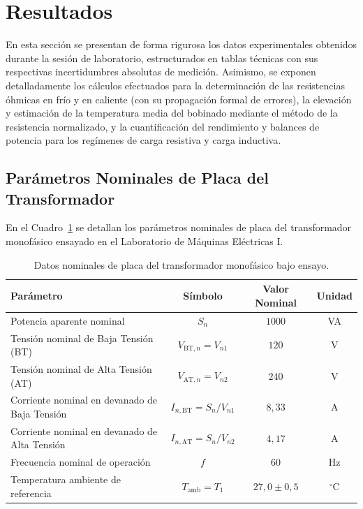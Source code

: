\section{Resultados}

En esta sección se presentan de forma rigurosa los datos experimentales obtenidos durante la sesión de laboratorio, estructurados en tablas técnicas con sus respectivas incertidumbres absolutas de medición. Asimismo, se exponen detalladamente los cálculos efectuados para la determinación de las resistencias óhmicas en frío y en caliente (con su propagación formal de errores), la elevación y estimación de la temperatura media del bobinado mediante el método de la resistencia normalizado, y la cuantificación del rendimiento y balances de potencia para los regímenes de carga resistiva y carga inductiva.

\subsection{Parámetros Nominales de Placa del Transformador}

En el Cuadro~\ref{tab:placa_tx} se detallan los parámetros nominales de placa del transformador monofásico ensayado en el Laboratorio de Máquinas Eléctricas I.

\begin{table}[htbp]
    \centering
    \caption{Datos nominales de placa del transformador monofásico bajo ensayo.}
    \label{tab:placa_tx}
    \begin{tabular}{l c c c}
        \toprule
        \textbf{Parámetro} & \textbf{Símbolo} & \textbf{Valor Nominal} & \textbf{Unidad} \\
        \midrule
        Potencia aparente nominal & $S_n$ & $1000$ & VA \\
        Tensión nominal de Baja Tensión (BT) & $V_{\text{BT},n} = V_{n1}$ & $120$ & V \\
        Tensión nominal de Alta Tensión (AT) & $V_{\text{AT},n} = V_{n2}$ & $240$ & V \\
        Corriente nominal en devanado de Baja Tensión & $I_{n,\text{BT}} = S_n / V_{n1}$ & $8{,}33$ & A \\
        Corriente nominal en devanado de Alta Tensión & $I_{n,\text{AT}} = S_n / V_{n2}$ & $4{,}17$ & A \\
        Frecuencia nominal de operación & $f$ & $60$ & Hz \\
        Temperatura ambiente de referencia & $T_{\text{amb}} = T_1$ & $27{,}0 \pm 0{,}5$ & $^{\circ}\mathrm{C}$ \\
        \bottomrule
    \end{tabular}
\end{table}

